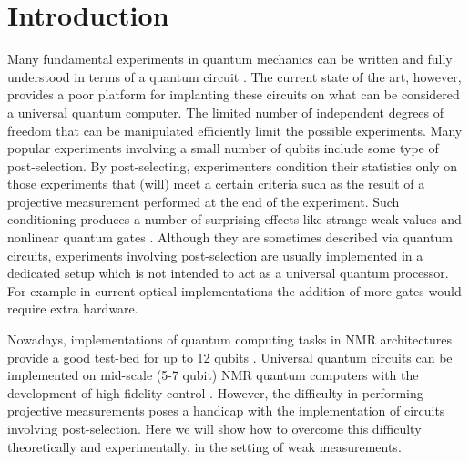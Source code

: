 \documentclass[aps,pra,12pt,onecolumn,showpacs,superscriptaddress,floatfix,footinbib,subfigure]{revtex4}
\begin{document}
\section{Introduction}
Many fundamental experiments in quantum mechanics can be written and fully understood in terms of a quantum circuit \cite{Deutsch1985}. The current state of the art, however,  provides a poor platform for implanting these circuits on what can be considered a universal quantum computer. The limited number of  independent degrees of freedom  that can be manipulated efficiently limit the possible experiments. Many popular experiments involving  a small number of qubits  include some type of  post-selection. By post-selecting,  experimenters  condition their statistics only on those experiments that (will) meet a certain criteria such as the result of a projective measurement performed at the end of the experiment. Such conditioning produces a number of surprising effects  like  strange weak values \cite{Aharonov1988} and nonlinear quantum gates \cite{Lloyd2011}. Although they are sometimes described via quantum circuits, experiments  involving post-selection are usually implemented in a dedicated setup  which is not intended to act as a universal quantum processor. For example in current optical implementations  \cite{Lundeen2006,Rozema2012} the addition of more gates would require extra hardware.

Nowadays, implementations of quantum computing tasks in NMR architectures provide a good test-bed for up to 12 qubits  \cite{Negrevergne2006}.  Universal quantum circuits can  be implemented  on  mid-scale (5-7 qubit) NMR quantum computers with the development of high-fidelity control \cite{NMRRsoc}. However, the difficulty in performing  projective measurements poses a  handicap with the implementation of  circuits involving  post-selection. Here we will show how to overcome this  difficulty theoretically and experimentally, in the setting of weak measurements.
\end{document}
